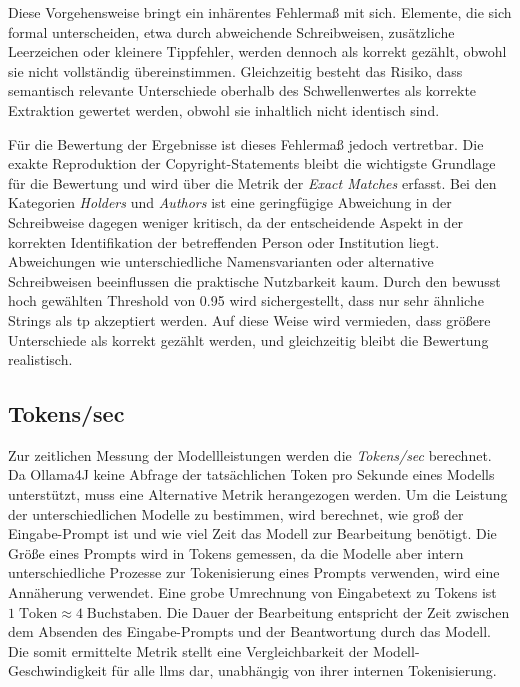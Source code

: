 Diese Vorgehensweise bringt ein inhärentes Fehlermaß mit sich.
Elemente, die sich formal unterscheiden, etwa durch abweichende Schreibweisen, zusätzliche Leerzeichen oder kleinere Tippfehler, werden dennoch als korrekt gezählt, obwohl sie nicht vollständig übereinstimmen.
Gleichzeitig besteht das Risiko, dass semantisch relevante Unterschiede oberhalb des Schwellenwertes als korrekte Extraktion gewertet werden, obwohl sie inhaltlich nicht identisch sind.

Für die Bewertung der Ergebnisse ist dieses Fehlermaß jedoch vertretbar.
Die exakte Reproduktion der Copyright-Statements bleibt die wichtigste Grundlage für die Bewertung und wird über die Metrik der \textit{Exact Matches} erfasst.
Bei den Kategorien \textit{Holders} und \textit{Authors} ist eine geringfügige Abweichung in der Schreibweise dagegen weniger kritisch, da der entscheidende Aspekt in der korrekten Identifikation der betreffenden Person oder Institution liegt.
Abweichungen wie unterschiedliche Namensvarianten oder alternative Schreibweisen beeinflussen die praktische Nutzbarkeit kaum.
Durch den bewusst hoch gewählten Threshold von \num{0,95} wird sichergestellt, dass nur sehr ähnliche Strings als \gls{tp} akzeptiert werden.
Auf diese Weise wird vermieden, dass größere Unterschiede als korrekt gezählt werden, und gleichzeitig bleibt die Bewertung realistisch.


\subsection{Tokens/sec}
Zur zeitlichen Messung der Modellleistungen werden die \textit{Tokens/sec} berechnet.
Da Ollama4J keine Abfrage der tatsächlichen Token pro Sekunde eines Modells unterstützt, muss eine Alternative Metrik herangezogen werden.
Um die Leistung der unterschiedlichen Modelle zu bestimmen, wird berechnet, wie groß der Eingabe-Prompt ist und wie viel Zeit das Modell zur Bearbeitung benötigt.
Die Größe eines Prompts wird in Tokens gemessen, da die Modelle aber intern unterschiedliche Prozesse zur Tokenisierung eines Prompts verwenden, wird eine Annäherung verwendet.
Eine grobe Umrechnung von Eingabetext zu Tokens ist $1\;\text{Token}\approx 4\;\text{Buchstaben}$\autocite{noauthor_what_nodate}.
Die Dauer der Bearbeitung entspricht der Zeit zwischen dem Absenden des Eingabe-Prompts und der Beantwortung durch das Modell.
Die somit ermittelte Metrik stellt eine Vergleichbarkeit der Modell-Geschwindigkeit für alle \glspl{llm} dar, unabhängig von ihrer internen Tokenisierung.

